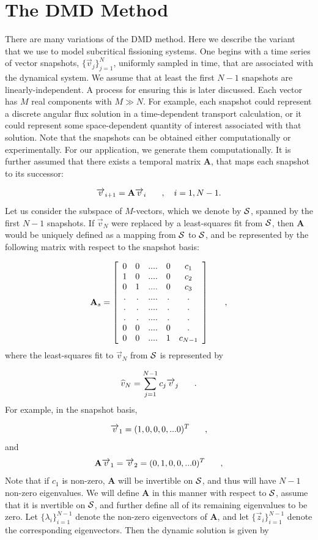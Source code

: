 \documentclass[12pt]{article}
\newcommand{\bracket}[1]{\left[ #1 \right]}
\renewcommand{\vec}[1]{\overrightarrow{#1}}
\newcommand{\be}{\begin{equation}}
\newcommand{\ee}{\end{equation}}
\newcommand{\pec}{\hspace{0.25in},}
\newcommand{\pep}{\hspace{0.25in}.}
\newcommand{\LEQ}[1]{\label{eq:#1}}
\newcommand{\cS}{{\cal S}}
\newcommand{\mA}{\mathbf{A}}
\begin{document}
\section{The DMD Method}
There are many variations of the DMD method.  
Here we describe the variant that we use to model subcritical fissioning systems.  
One begins with a time series of vector snapshots, $\{\vec{v}_j\}_{j=1}^{N}$, uniformly sampled in time, 
	that are associated with the dynamical system. 
We assume that at least the first $N-1$ snapshots are linearly-independent. 
A process for ensuring this is later discussed.  
Each vector has $M$ real components with $M \gg N$. 
For example, each snapshot could represent a discrete angular flux solution in a time-dependent 
	transport calculation, or it could represent some space-dependent quantity of interest associated 
	with that solution.  
Note that the snapshots can be obtained either computationally or experimentally. 
For our application, we generate them computationally. 
It is further assumed that there exists a temporal matrix $\mathbf{A}$, that maps each snapshot to its 
	successor:

\be
	\vec{v}_{i+1} = \mA \vec{v}_{i} \pec \quad i=1,N-1.
	\LEQ{2.1}
\ee
Let us consider the subspace of $M$-vectors, which we denote by $\cS$, spanned by the first $N-1$ 
snapshots.  
If $\vec{v}_N$ were replaced by a least-squares fit from $\cS$, then $\mA$ would be uniquely defined 
	as a mapping from $\cS$ to $\cS$, and be represented by the following matrix with respect to the 
	snapshot basis:
	
\be
	\mA_s = \bracket{
	\begin{array}{ccccccc}
		0 & 0 & ....& 0 & c_1 \\
		1 & 0 & ....& 0 & c_2 \\
		0 & 1 & ....& 0 & c_3 \\
		. & . & ....& . & . \\
		. & . & ....& . & . \\
		. & . & ....& . & . \\
		0 & 0 & ....& 0 & . \\
		0 & 0 & ....& 1 & c_{N-1}
	\end{array}
	} \pec
	\LEQ{2.2}
\ee
where the least-squares fit to $\vec{v}_N$ from $\cS$ is represented by

\be
	\widehat{v}_N = \sum_{j=1}^{N-1} c_j \vec{v}_j \pep
	\LEQ{2.3}
\ee
For example, in the snapshot basis,

\be
	\vec{v}_1 = (1,0,0,0,...0)^T \pec
	\LEQ{2.4}
\ee
and 
\be
	\mA \vec{v}_1 = \vec{v}_2 = (0,1,0,0,...0)^T \pec
	\LEQ{2.5}
\ee
Note that if $c_1$ is non-zero, $\mA$ will be invertible on $\cS$, and thus will have $N-1$ non-zero eigenvalues. 
We will define $\mA$ in this manner with respect to $\cS$, assume that it is nvertible on $\cS$, and 
	further define all of its remaining eigenvalues to be zero.  
Let $\{\lambda_i\}_{i=1}^{N-1}$ denote the non-zero eigenvectors of $\mA$, and let 
	$\{\vec{z}_i\}_{i=1}^{N-1}$ denote the corresponding eigenvectors. 
Then the dynamic solution is given by 
\end{document}
